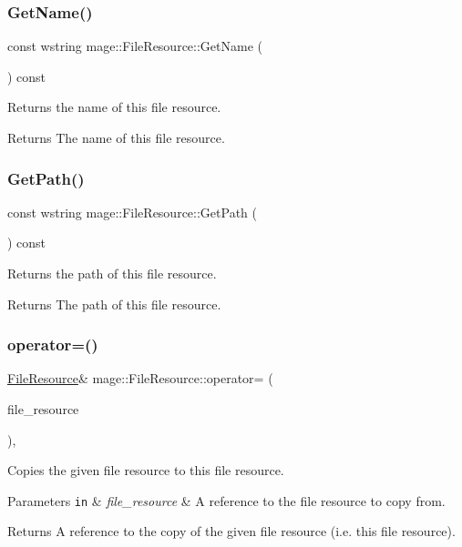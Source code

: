 \subsubsection{\texorpdfstring{Get\+Name()}{GetName()}}
{\footnotesize\ttfamily const wstring mage\+::\+File\+Resource\+::\+Get\+Name (\begin{DoxyParamCaption}{ }\end{DoxyParamCaption}) const}

Returns the name of this file resource.

\begin{DoxyReturn}{Returns}
The name of this file resource. 
\end{DoxyReturn}
\hypertarget{classmage_1_1_file_resource_a6dd2da5d50dbe8b3ac4189cdaa5fc325}{}\label{classmage_1_1_file_resource_a6dd2da5d50dbe8b3ac4189cdaa5fc325} 
\subsubsection{\texorpdfstring{Get\+Path()}{GetPath()}}
{\footnotesize\ttfamily const wstring mage\+::\+File\+Resource\+::\+Get\+Path (\begin{DoxyParamCaption}{ }\end{DoxyParamCaption}) const}

Returns the path of this file resource.

\begin{DoxyReturn}{Returns}
The path of this file resource. 
\end{DoxyReturn}
\hypertarget{classmage_1_1_file_resource_a195da42fa3a40991e7c38cf8305b0bf2}{}\label{classmage_1_1_file_resource_a195da42fa3a40991e7c38cf8305b0bf2} 
\subsubsection{\texorpdfstring{operator=()}{operator=()}}
{\footnotesize\ttfamily \hyperlink{classmage_1_1_file_resource}{File\+Resource}\& mage\+::\+File\+Resource\+::operator= (\begin{DoxyParamCaption}\item[{const \hyperlink{classmage_1_1_file_resource}{File\+Resource} \&}]{file\+\_\+resource }\end{DoxyParamCaption})\hspace{0.3cm}{\ttfamily [private]}, {\ttfamily [delete]}}

Copies the given file resource to this file resource.


\begin{DoxyParams}[1]{Parameters}
\mbox{\tt in}  & {\em file\+\_\+resource} & A reference to the file resource to copy from. \\
\hline
\end{DoxyParams}
\begin{DoxyReturn}{Returns}
A reference to the copy of the given file resource (i.\+e. this file resource). 
\end{DoxyReturn}
